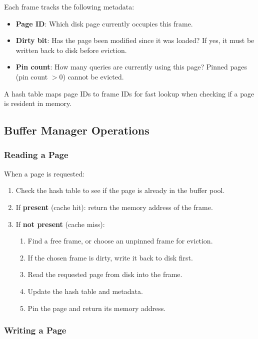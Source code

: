 Each frame tracks the following metadata:
\begin{itemize}
    \item \textbf{Page ID}: Which disk page currently occupies this frame.
    \item \textbf{Dirty bit}: Has the page been modified since it was loaded? If yes, it must be written back to disk before eviction.
    \item \textbf{Pin count}: How many queries are currently using this page? Pinned pages (pin count $> 0$) cannot be evicted.
\end{itemize}

A hash table maps page IDs to frame IDs for fast lookup when checking if a page is resident in memory.

\subsection{Buffer Manager Operations}

\subsubsection*{Reading a Page}

When a page is requested:
\begin{enumerate}
    \item Check the hash table to see if the page is already in the buffer pool.
    \item If \textbf{present} (cache hit): return the memory address of the frame.
    \item If \textbf{not present} (cache miss):
    \begin{enumerate}
        \item Find a free frame, or choose an unpinned frame for eviction.
        \item If the chosen frame is dirty, write it back to disk first.
        \item Read the requested page from disk into the frame.
        \item Update the hash table and metadata.
        \item Pin the page and return its memory address.
    \end{enumerate}
\end{enumerate}

\subsubsection*{Writing a Page}

